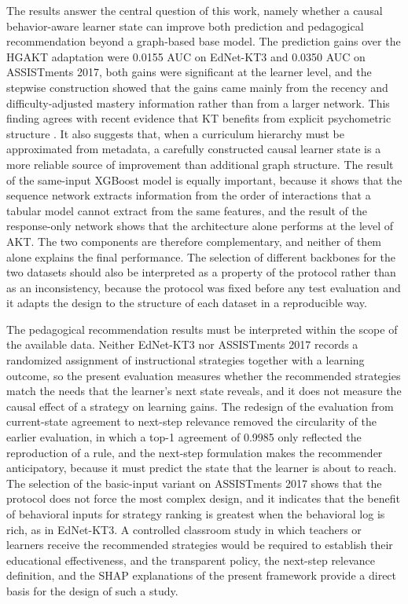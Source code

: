 \documentclass[11pt]{article}
\begin{document}
The results answer the central question of this work, namely whether a causal behavior-aware learner state can improve both prediction and pedagogical recommendation beyond a graph-based base model. The prediction gains over the HGAKT adaptation were 0.0155 AUC on EdNet-KT3 and 0.0350 AUC on ASSISTments 2017, both gains were significant at the learner level, and the stepwise construction showed that the gains came mainly from the recency and difficulty-adjusted mastery information rather than from a larger network. This finding agrees with recent evidence that KT benefits from explicit psychometric structure \cite{guo2025deep}. It also suggests that, when a curriculum hierarchy must be approximated from metadata, a carefully constructed causal learner state is a more reliable source of improvement than additional graph structure. The result of the same-input XGBoost model is equally important, because it shows that the sequence network extracts information from the order of interactions that a tabular model cannot extract from the same features, and the result of the response-only network shows that the architecture alone performs at the level of AKT. The two components are therefore complementary, and neither of them alone explains the final performance. The selection of different backbones for the two datasets should also be interpreted as a property of the protocol rather than as an inconsistency, because the protocol was fixed before any test evaluation and it adapts the design to the structure of each dataset in a reproducible way.

The pedagogical recommendation results must be interpreted within the scope of the available data. Neither EdNet-KT3 nor ASSISTments 2017 records a randomized assignment of instructional strategies together with a learning outcome, so the present evaluation measures whether the recommended strategies match the needs that the learner's next state reveals, and it does not measure the causal effect of a strategy on learning gains. The redesign of the evaluation from current-state agreement to next-step relevance removed the circularity of the earlier evaluation, in which a top-1 agreement of 0.9985 only reflected the reproduction of a rule, and the next-step formulation makes the recommender anticipatory, because it must predict the state that the learner is about to reach. The selection of the basic-input variant on ASSISTments 2017 shows that the protocol does not force the most complex design, and it indicates that the benefit of behavioral inputs for strategy ranking is greatest when the behavioral log is rich, as in EdNet-KT3. A controlled classroom study in which teachers or learners receive the recommended strategies would be required to establish their educational effectiveness, and the transparent policy, the next-step relevance definition, and the SHAP explanations of the present framework provide a direct basis for the design of such a study.
\end{document}
